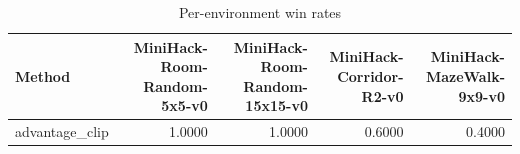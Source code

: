 \begin{table}[htbp]
\centering
\caption{Per-environment win rates}
\label{tab:per-env}
\begin{tabular}{lrrrr}
\toprule
\textbf{Method} & \textbf{MiniHack-Room-Random-5x5-v0} & \textbf{MiniHack-Room-Random-15x15-v0} & \textbf{MiniHack-Corridor-R2-v0} & \textbf{MiniHack-MazeWalk-9x9-v0} \\
\midrule
advantage\_clip & 1.0000 & 1.0000 & 0.6000 & 0.4000 \\
\bottomrule
\end{tabular}
\end{table}